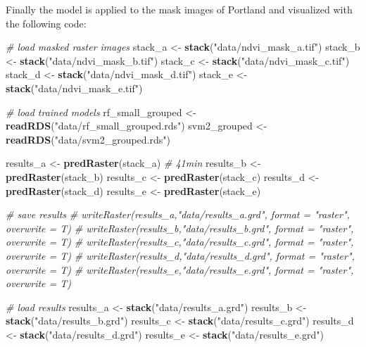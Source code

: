 \documentclass[12pt,twoside]{reedthesis}
\newenvironment{Shaded}{\begin{snugshade}}{\end{snugshade}}
\newcommand{\CommentTok}[1]{\textcolor[rgb]{0.56,0.35,0.01}{\textit{#1}}}
\newcommand{\KeywordTok}[1]{\textcolor[rgb]{0.13,0.29,0.53}{\textbf{#1}}}
\newcommand{\NormalTok}[1]{#1}
\newcommand{\StringTok}[1]{\textcolor[rgb]{0.31,0.60,0.02}{#1}}
\begin{document}
Finally the model is applied to the mask images of Portland and visualized with the following code:
\begin{Shaded}
\begin{Highlighting}[]
\CommentTok{# load masked raster images}
\NormalTok{stack_a <-}\StringTok{ }\KeywordTok{stack}\NormalTok{(}\StringTok{"data/ndvi_mask_a.tif"}\NormalTok{)}
\NormalTok{stack_b <-}\StringTok{ }\KeywordTok{stack}\NormalTok{(}\StringTok{"data/ndvi_mask_b.tif"}\NormalTok{)}
\NormalTok{stack_c <-}\StringTok{ }\KeywordTok{stack}\NormalTok{(}\StringTok{"data/ndvi_mask_c.tif"}\NormalTok{)}
\NormalTok{stack_d <-}\StringTok{ }\KeywordTok{stack}\NormalTok{(}\StringTok{"data/ndvi_mask_d.tif"}\NormalTok{)}
\NormalTok{stack_e <-}\StringTok{ }\KeywordTok{stack}\NormalTok{(}\StringTok{"data/ndvi_mask_e.tif"}\NormalTok{)}

\CommentTok{# load trained models}
\NormalTok{rf_small_grouped <-}\StringTok{ }\KeywordTok{readRDS}\NormalTok{(}\StringTok{"data/rf_small_grouped.rds"}\NormalTok{)}
\NormalTok{svm2_grouped <-}\StringTok{ }\KeywordTok{readRDS}\NormalTok{(}\StringTok{"data/svm2_grouped.rds"}\NormalTok{)}

\NormalTok{results_a <-}\StringTok{ }\KeywordTok{predRaster}\NormalTok{(stack_a) }\CommentTok{# 41min}
\NormalTok{results_b <-}\StringTok{ }\KeywordTok{predRaster}\NormalTok{(stack_b)}
\NormalTok{results_c <-}\StringTok{ }\KeywordTok{predRaster}\NormalTok{(stack_c)}
\NormalTok{results_d <-}\StringTok{ }\KeywordTok{predRaster}\NormalTok{(stack_d)}
\NormalTok{results_e <-}\StringTok{ }\KeywordTok{predRaster}\NormalTok{(stack_e)}

\CommentTok{# save results}
\CommentTok{# writeRaster(results_a,"data/results_a.grd", format = "raster", overwrite = T)}
\CommentTok{# writeRaster(results_b,"data/results_b.grd", format = "raster", overwrite = T)}
\CommentTok{# writeRaster(results_c,"data/results_c.grd", format = "raster", overwrite = T)}
\CommentTok{# writeRaster(results_d,"data/results_d.grd", format = "raster", overwrite = T)}
\CommentTok{# writeRaster(results_e,"data/results_e.grd", format = "raster", overwrite = T)}

\CommentTok{# load results}
\NormalTok{results_a <-}\StringTok{ }\KeywordTok{stack}\NormalTok{(}\StringTok{"data/results_a.grd"}\NormalTok{)}
\NormalTok{results_b <-}\StringTok{ }\KeywordTok{stack}\NormalTok{(}\StringTok{"data/results_b.grd"}\NormalTok{)}
\NormalTok{results_c <-}\StringTok{ }\KeywordTok{stack}\NormalTok{(}\StringTok{"data/results_c.grd"}\NormalTok{)}
\NormalTok{results_d <-}\StringTok{ }\KeywordTok{stack}\NormalTok{(}\StringTok{"data/results_d.grd"}\NormalTok{)}
\NormalTok{results_e <-}\StringTok{ }\KeywordTok{stack}\NormalTok{(}\StringTok{"data/results_e.grd"}\NormalTok{)}


\end{Highlighting}
\end{Shaded}
\end{document}
